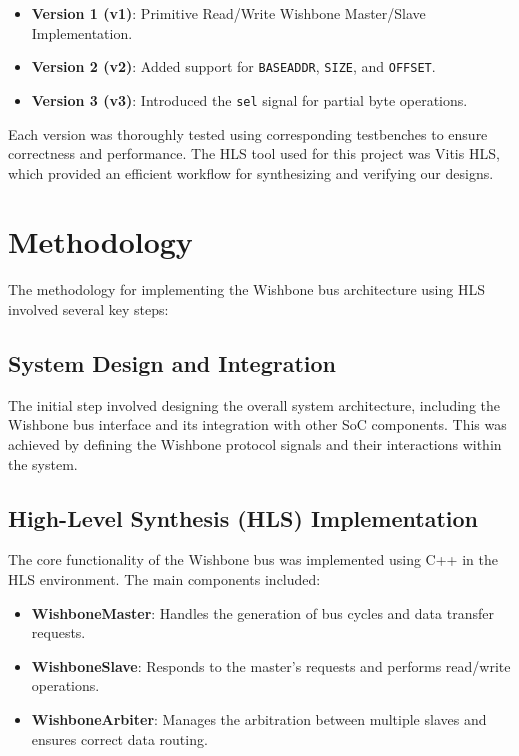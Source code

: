 \documentclass[12pt]{report}
\begin{document}
\begin{itemize}
    \item \textbf{Version 1 (v1)}: Primitive Read/Write Wishbone Master/Slave Implementation.
    \item \textbf{Version 2 (v2)}: Added support for \texttt{BASEADDR}, \texttt{SIZE}, and \texttt{OFFSET}.
    \item \textbf{Version 3 (v3)}: Introduced the \texttt{sel} signal for partial byte operations.
\end{itemize}

Each version was thoroughly tested using corresponding testbenches to ensure correctness and performance. The HLS tool used for this project was Vitis HLS, which provided an efficient workflow for synthesizing and verifying our designs.





\section{Methodology}

The methodology for implementing the Wishbone bus architecture using HLS involved several key steps:

\subsection{System Design and Integration}
The initial step involved designing the overall system architecture, including the Wishbone bus interface and its integration with other SoC components. This was achieved by defining the Wishbone protocol signals and their interactions within the system.

\subsection{High-Level Synthesis (HLS) Implementation}
The core functionality of the Wishbone bus was implemented using C++ in the HLS environment. The main components included:
\begin{itemize}
    \item \textbf{WishboneMaster}: Handles the generation of bus cycles and data transfer requests.
    \item \textbf{WishboneSlave}: Responds to the master's requests and performs read/write operations.
    \item \textbf{WishboneArbiter}: Manages the arbitration between multiple slaves and ensures correct data routing.
\end{itemize}
\end{document}
